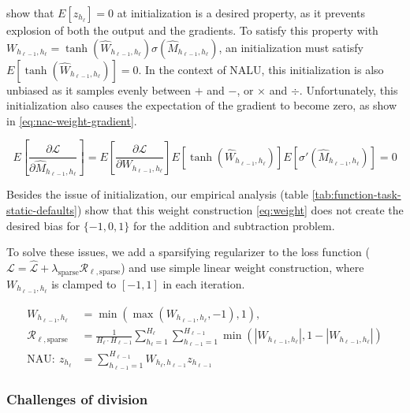 \citet{glorot-initialization} show that $E[z_{h_\ell}] = 0$ at initialization is a desired property, as it prevents explosion of both the output and the gradients. To satisfy this property with $W_{h_{\ell-1},h_\ell} = \tanh(\hat{W}_{h_{\ell-1},h_\ell}) \sigma(\hat{M}_{h_{\ell-1},h_\ell})$, an initialization must satisfy $E[\tanh(\hat{W}_{h_{\ell-1},h_\ell})] = 0$. In the context of NALU, this initialization is also unbiased as it samples evenly between $+$ and $-$, or $\times$ and $\div$. Unfortunately, this initialization also causes the expectation of the gradient to become zero, as show in \eqref{eq:nac-weight-gradient}.

\begin{equation}
E\left[\frac{\partial \mathcal{L}}{\partial \hat{M}_{h_{\ell-1},h_\ell}}\right] = E\left[\frac{\partial \mathcal{L}}{\partial W_{h_{\ell-1},h_\ell}}\right] E\left[\tanh(\hat{W}_{h_{\ell-1},h_\ell})\right] E\left[\sigma'(\hat{M}_{h_{\ell-1},h_\ell})\right] = 0
\label{eq:nac-weight-gradient}
\end{equation}

Besides the issue of initialization, our empirical analysis (table \ref{tab:function-task-static-defaults}) show that this weight construction \eqref{eq:weight} does not create the desired bias for $\{-1, 0, 1\}$ for the addition and subtraction problem.

To solve these issues, we add a sparsifying regularizer to the loss function ($\mathcal{L} = \hat{\mathcal{L}} + \lambda_{\mathrm{sparse}} \mathcal{R}_{\ell,\mathrm{sparse}}$) and use simple linear weight construction, where $W_{h_{\ell-1},h_\ell}$ is clamped to $[-1, 1]$ in each iteration.

\begin{align}
W_{h_{\ell-1},h_\ell} &= \min(\max(W_{h_{\ell-1},h_\ell}, -1), 1), \\
\mathcal{R}_{\ell,\mathrm{sparse}} &= \frac{1}{H_\ell \cdot H_{\ell-1}} \sum_{h_\ell=1}^{H_\ell} \sum_{h_{\ell-1}=1}^{H_{\ell-1}} \min\left(|W_{h_{\ell-1},h_\ell}|, 1 - \left|W_{h_{\ell-1},h_\ell}\right|\right) \\
\textrm{NAU}:\ z_{h_\ell} &= \sum_{h_{\ell-1}=1}^{H_{\ell-1}} W_{h_{\ell}, h_{\ell-1}} z_{h_{\ell-1}}
\end{align}

\subsubsection{Challenges of division} \label{sssec:nac-mul}

